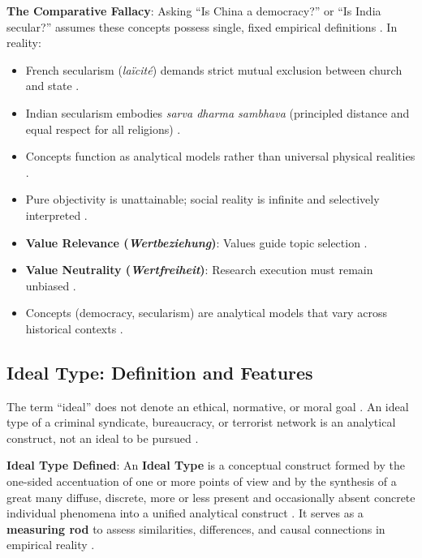 \begin{CriticalPoint}
\textbf{The Comparative Fallacy}: Asking ``Is China a democracy?'' or ``Is India secular?'' assumes these concepts possess single, fixed empirical definitions . In reality:
\begin{itemize}
    \item French secularism (\textit{la\"icit\'e}) demands strict mutual exclusion between church and state .
    \item Indian secularism embodies \textit{sarva dharma sambhava} (principled distance and equal respect for all religions) .
    \item Concepts function as analytical models rather than universal physical realities .
\end{itemize}
\end{CriticalPoint}

\begin{QuickRevision}
\begin{itemize}
    \item Pure objectivity is unattainable; social reality is infinite and selectively interpreted .
    \item \textbf{Value Relevance (\textit{Wertbeziehung})}: Values guide topic selection .
    \item \textbf{Value Neutrality (\textit{Wertfreiheit})}: Research execution must remain unbiased .
    \item Concepts (democracy, secularism) are analytical models that vary across historical contexts .
\end{itemize}
\end{QuickRevision}

\subsection{Ideal Type: Definition and Features}

\begin{CriticalPoint}
The term ``ideal'' does not denote an ethical, normative, or moral goal . An ideal type of a criminal syndicate, bureaucracy, or terrorist network is an analytical construct, not an ideal to be pursued .
\end{CriticalPoint}

\begin{KeyConcept}
\textbf{Ideal Type Defined}: An \textbf{Ideal Type} is a conceptual construct formed by the one-sided accentuation of one or more points of view and by the synthesis of a great many diffuse, discrete, more or less present and occasionally absent concrete individual phenomena into a unified analytical construct . It serves as a \textbf{measuring rod} to assess similarities, differences, and causal connections in empirical reality .
\end{KeyConcept}

